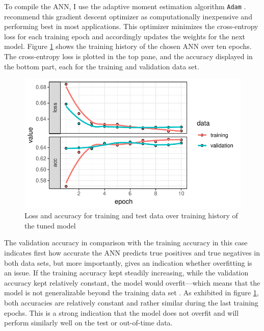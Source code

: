 \documentclass[12pt,a4paper]{article}
\let\code=\texttt
\begin{document}
To compile the ANN, I use the adaptive moment estimation algorithm \code{Adam} \citep{kingmaAdamMethodStochastic2014}.
\cite{ruderOverviewGradientDescent2016} recommend this gradient descent optimizer as computationally inexpensive and performing best in most applications.
This optimizer minimizes the cross-entropy loss \citep{zhangGeneralizedCrossEntropy2018} for each training epoch and accordingly updates the weights
for the next model.
Figure \ref{fig_history} shows the training history of the chosen ANN over ten epochs. The cross-entropy loss is plotted in the top pane, and the accuracy
displayed in the bottom part, each for the training and validation data set.

\begin{figure}[ht]
	\centering
  \includegraphics[scale=0.8]{figures/train_history.pdf}
	\caption{Loss and accuracy for training and test data over training history of the tuned model}
	\label{fig_history}
\end{figure}
The validation accuracy in comparison with the training accuracy in this case indicates first how accurate the ANN predicts true positives 
and true negatives in both data sets, but more importantly, gives an indication whether overfitting is an issue.
If the training accuracy kept steadily increasing, while the validation accuracy kept relatively constant, the model would overfit---which means
that the model is not generalizable beyond the training data set \citep{hansenNeuralNetworkEnsembles1990}.
As exhibited in figure \ref{fig_history}, both accuracies are relatively constant and rather similar during the last training epochs.
This is a strong indication that the model does not overfit and will perform similarly well on the test or out-of-time data.
\end{document}
